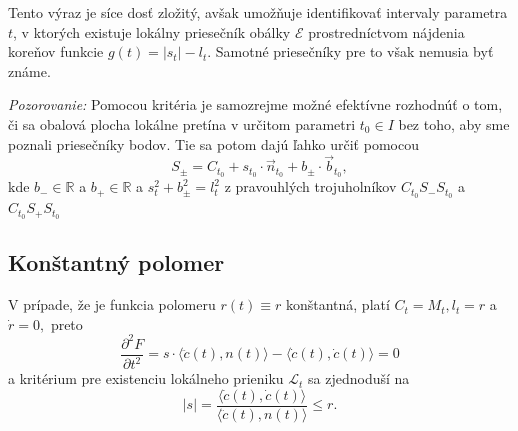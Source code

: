 Tento výraz je síce dosť zložitý, avšak umožňuje identifikovať intervaly parametra $ t $, v ktorých existuje lokálny priesečník obálky $ \mathcal{E} $ prostredníctvom nájdenia koreňov funkcie $ g(t) = | s_t | - l_t $. Samotné priesečníky pre to však nemusia byť známe.

\textit{Pozorovanie:}
Pomocou kritéria je samozrejme možné efektívne rozhodnúť o tom, či sa obalová plocha lokálne pretína v určitom parametri $t_0 \in I$ bez toho, aby sme poznali priesečníky bodov. Tie sa potom dajú ľahko určiť pomocou
$$
S_{\pm} = C_{t_0} + s_{t_0} \cdot \vec{n}_{t_0} + b_{\pm} \cdot \vec{b}_{t_0},
$$
kde $ b_{-} \in \mathbb{R} $ a $ b_{+} \in \mathbb{R} $ a $s_t^2 + b_{\pm}^2 = l_t^2 $ z pravouhlých trojuholníkov $C_{t_0}S_{-}S_{t_0}$ a $C_{t_0}S_{+}S_{t_0}$

\subsection{Konštantný polomer}
V prípade, že je funkcia polomeru $r(t) \equiv r $ konštantná, platí $C_t = M_t,  l_t = r$ a $\dot{r} = 0,$ preto 
$$\dfrac{\partial^2 F}{\partial t^2} = s \cdot \langle \ddot{c}(t), n(t) \rangle - \langle \dot{c}(t), \dot{c}(t) \rangle = 0$$
a kritérium pre existenciu lokálneho prieniku $\mathcal{L}_t$ sa zjednoduší na
$$
\lvert s \rvert = \frac{\langle \dot{c}(t), \dot{c}(t) \rangle}{\langle \ddot{c}(t), n(t) \rangle} \leq r.
$$
